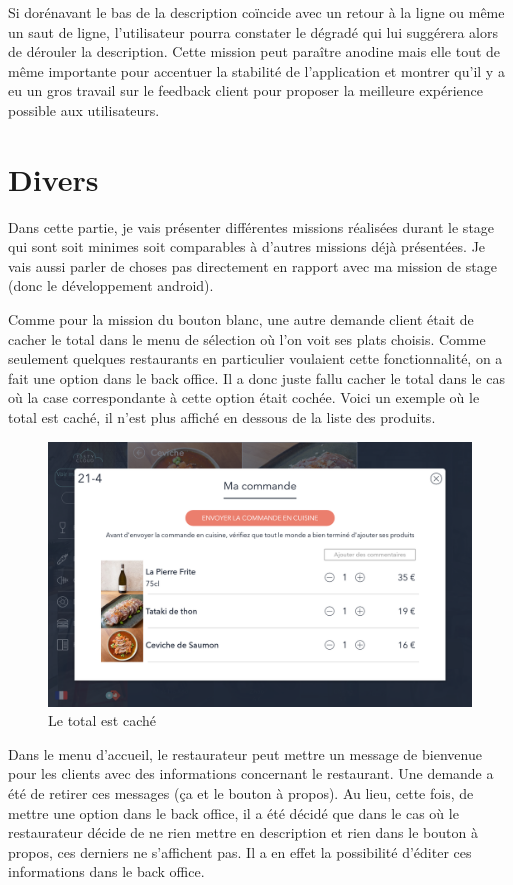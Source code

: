 Si dorénavant le bas de la description coïncide avec un retour à la ligne ou même un saut de ligne, l'utilisateur pourra constater le dégradé qui lui suggérera alors de dérouler la description. Cette mission peut paraître anodine mais elle tout de même importante pour accentuer la stabilité de l'application et montrer qu'il y a eu un gros travail sur le feedback client pour proposer la meilleure expérience possible aux utilisateurs.

\section{Divers}

Dans cette partie, je vais présenter différentes missions réalisées durant le stage qui sont soit minimes soit comparables à d'autres missions déjà présentées. Je vais aussi parler de choses pas directement en rapport avec ma mission de stage (donc le développement android).

Comme pour la mission du bouton blanc, une autre demande client était de cacher le total dans le menu de sélection où l'on voit ses plats choisis. Comme seulement quelques restaurants en particulier voulaient cette fonctionnalité, on a fait une option dans le back office. Il a donc juste fallu cacher le total dans le cas où la case correspondante à cette option était cochée. Voici un exemple où le total est caché, il n'est plus affiché en dessous de la liste des produits.

\begin{figure}[!htb]
  \centering
  \includegraphics[width=115mm,scale=0.5]{images/divers.png}
  \caption{Le total est caché}
  \label{fig:boat1}
\end{figure}

Dans le menu d'accueil, le restaurateur peut mettre un message de bienvenue pour les clients avec des informations concernant le restaurant. Une demande a été de retirer ces messages (ça et le bouton à propos). Au lieu, cette fois, de mettre une option dans le back office, il a été décidé que dans le cas où le restaurateur décide de ne rien mettre en description et rien dans le bouton à propos, ces derniers ne s'affichent pas. Il a en effet la possibilité d'éditer ces informations dans le back office.

